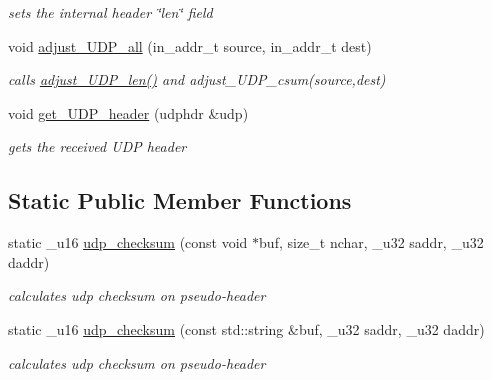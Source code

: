 \begin{CompactItemize}
\begin{CompactList}\small\item\em sets the internal header \char`\"{}len\char`\"{} field \item\end{CompactList}\item 
void \hyperlink{classsocketpp_1_1UDP__RawSocket_4fe2e6b184ca8f8248a187df30e12fd2}{adjust\_\-UDP\_\-all} (in\_\-addr\_\-t source, in\_\-addr\_\-t dest)
\begin{CompactList}\small\item\em calls \hyperlink{classsocketpp_1_1UDP__RawSocket_1caa413cfe4f72d8c0aeccdcb10469b5}{adjust\_\-UDP\_\-len()} and adjust\_\-UDP\_\-csum(source,dest) \item\end{CompactList}\item 
void \hyperlink{classsocketpp_1_1UDP__RawSocket_597a30fc537dce06c85663add29defdc}{get\_\-UDP\_\-header} (udphdr \&udp)
\begin{CompactList}\small\item\em gets the received UDP header \item\end{CompactList}\end{CompactItemize}
\subsection*{Static Public Member Functions}
\begin{CompactItemize}
\item 
static \_\-u16 \hyperlink{classsocketpp_1_1UDP__RawSocket_fdc782d0436fd9c6d24520034d445063}{udp\_\-checksum} (const void $\ast$buf, size\_\-t nchar, \_\-u32 saddr, \_\-u32 daddr)
\begin{CompactList}\small\item\em calculates udp checksum on pseudo-header \item\end{CompactList}\item 
static \_\-u16 \hyperlink{classsocketpp_1_1UDP__RawSocket_166b30d9061b06336dc637cd3a25d12f}{udp\_\-checksum} (const std::string \&buf, \_\-u32 saddr, \_\-u32 daddr)
\begin{CompactList}\small\item\em calculates udp checksum on pseudo-header \item\end{CompactList}\end{CompactItemize}
